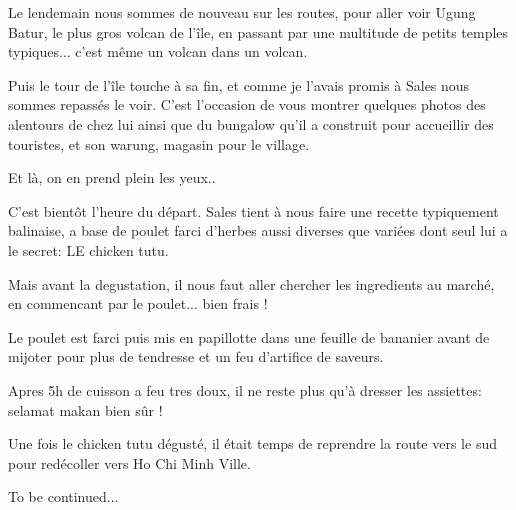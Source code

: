 \begin{multicols}{2}

Le lendemain nous sommes de nouveau sur les routes, pour aller voir Ugung Batur, le plus gros volcan de l'île, en passant par une multitude de petits temples typiques... c'est même un volcan dans un volcan.


Puis le tour de l'île touche à sa fin, et comme je l'avais promis à Sales nous sommes repassés le voir. C'est l'occasion de vous montrer quelques photos des alentours de chez lui ainsi que du bungalow qu'il a construit pour accueillir des touristes, et son warung, magasin pour le village.


Et là, on en prend plein les yeux..


C'est bientôt l'heure du départ. Sales tient à nous faire une recette typiquement balinaise, a base de poulet farci d'herbes aussi diverses que variées dont seul lui a le secret: LE chicken tutu.

Mais avant la degustation, il nous faut aller chercher les ingredients au marché, en commencant par le poulet... bien frais !


Le poulet est farci puis mis en papillotte dans une feuille de bananier avant de mijoter pour plus de tendresse et un feu d'artifice de saveurs.


Apres 5h de cuisson a feu tres doux, il ne reste plus qu'à dresser les assiettes: selamat makan bien sûr !


Une fois le chicken tutu dégusté, il était temps de reprendre la route vers le sud pour redécoller vers Ho Chi Minh Ville.

To be continued...

\end{multicols}
